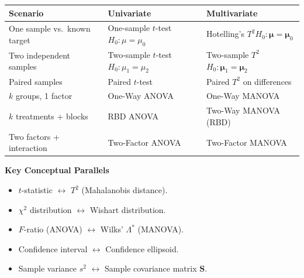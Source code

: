 \documentclass[12pt, a4paper]{article}
\newcommand{\muv}{\boldsymbol{\mu}}
\begin{document}
\begin{center}
\renewcommand{\arraystretch}{1.4}
\begin{tabular}{p{4.2cm} p{4.5cm} p{4.5cm}}
\toprule
\textbf{Scenario} & \textbf{Univariate} & \textbf{Multivariate} \\
\midrule
One sample vs.\ known target
  & One-sample $t$-test\newline $H_0: \mu = \mu_0$
  & Hotelling's $T^2$\newline $H_0: \muv = \muv_0$ \\
Two independent samples
  & Two-sample $t$-test\newline $H_0: \mu_1 = \mu_2$
  & Two-sample $T^2$\newline $H_0: \muv_1 = \muv_2$ \\
Paired samples
  & Paired $t$-test
  & Paired $T^2$ on differences \\
$k$ groups, 1 factor
  & One-Way ANOVA
  & One-Way MANOVA \\
$k$ treatments + blocks
  & RBD ANOVA
  & Two-Way MANOVA (RBD) \\
Two factors + interaction
  & Two-Factor ANOVA
  & Two-Factor MANOVA \\
\bottomrule
\end{tabular}
\end{center}

\vspace{1cm}
\begin{keybox}\noindent\textbf{Key Conceptual Parallels}\par\smallskip
\begin{itemize}
  \item $t$-statistic $\longleftrightarrow$ $T^2$ (Mahalanobis distance).
  \item $\chi^2$ distribution $\longleftrightarrow$ Wishart distribution.
  \item $F$-ratio (ANOVA) $\longleftrightarrow$ Wilks' $\Lambda^*$ (MANOVA).
  \item Confidence interval $\longleftrightarrow$ Confidence ellipsoid.
  \item Sample variance $s^2$ $\longleftrightarrow$ Sample covariance matrix $\mathbf{S}$.
\end{itemize}
\end{keybox}
\end{document}
